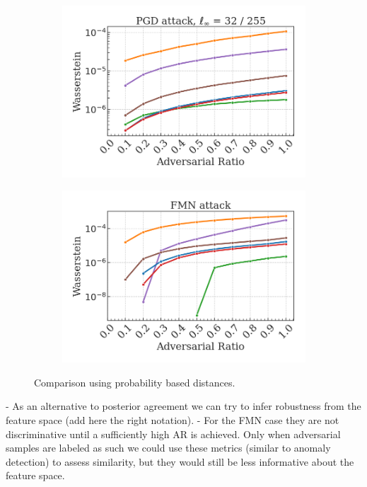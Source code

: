 \begin{figure}[H]
    \begin{subfigure}[b]{0.45\textwidth}
        \centering
        \includegraphics[width=\textwidth]{img/results_discussion/adversarial/PGD_W.png}
    \end{subfigure}
    \hfill
    \begin{subfigure}[b]{0.45\textwidth}
        \centering
        \includegraphics[width=\textwidth]{img/results_discussion/adversarial/FMN_W.png}
    \end{subfigure}

    \caption{Comparison using probability based distances.}
    \label{fig:six_figures}
\end{figure}

- As an alternative to posterior agreement we can try to infer robustness from the feature space (add here the right notation).
- For the FMN case they are not discriminative until a sufficiently high AR is achieved. Only when adversarial samples are labeled as such we could use these metrics (similar to anomaly detection) to assess similarity, but they would still be less informative about the feature space.

